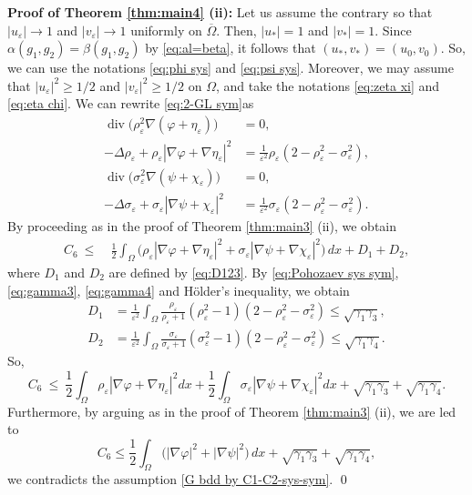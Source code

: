 \documentclass[a4paper,10pt,reqno]{amsart}
\theoremstyle{definition}
\newcommand{\al}{{\alpha}}
\newcommand{\ga}{{\gamma}}
\newcommand{\ve}{{\varepsilon}}
\newcommand{\vp}{{\varphi}}
\newcommand{\Om}{{\Omega}}
\numberwithin{equation}{section}
\begin{document}
 \smallskip
{\bf Proof of Theorem \ref{thm:main4} (ii): }
Let us assume the contrary so that $|u_\ve|\to 1$ and $|v_\ve|\to 1$ uniformly on $\overline\Om$.
Then, $|u_*|=1$ and $|v_*|=1$.
Since $\al(g_1,g_2)=\beta (g_1,g_2)$ by \eqref{eq:al=beta}, it follows that $(u_*,v_*)=(u_0,v_0)$.
So, we can use the notations \eqref{eq:phi sys} and \eqref{eq:psi sys}.
Moreover,   we may assume that $|u_\ve|^2 \ge 1/2$ and $|v_\ve|^2 \ge 1/2$ on $\Om$, and take the notations \eqref{eq:zeta xi} and \eqref{eq:eta chi}.
We can rewrite  \eqref{eq:2-GL sym}as
\begin{align}
\label{eq:rho-sys}
\operatorname{div} \big(\rho_\varepsilon^2 \nabla( \varphi+\eta_\varepsilon )\big) &= 0,  \\
\label{eq:zeta-sys}
-\Delta \rho_\varepsilon + \rho_\varepsilon | \nabla \varphi + \nabla \eta_\varepsilon |^2
&= \frac{1}{\varepsilon^2}\rho_\varepsilon \left( 2 -  \rho_\varepsilon^2  - \sigma_\varepsilon^2\right)  ,\\
\label{eq:sigma-sys}
\operatorname{div}\big(\sigma_\varepsilon^2 \nabla( \psi+\chi_\varepsilon )\big) &= 0, \\
\label{eq:xi-sys}
-\Delta \sigma_\varepsilon + \sigma_\varepsilon |  \nabla \psi+\chi_\varepsilon |^2
&= \frac{1}{\varepsilon^2}\sigma_\varepsilon \left( 2 -  \rho_\varepsilon^2  - \sigma_\varepsilon^2\right) .
\end{align}
By proceeding as in the proof of Theorem \ref{thm:main3} (ii), we obtain
\begin{align*}
C_6 ~ \le ~&   \frac12 \int_\Omega  \Big( \rho_\varepsilon  | \nabla \varphi+\nabla \eta_\varepsilon|^2
+ \sigma_\varepsilon  | \nabla \psi+\nabla \chi_\varepsilon |^2\Big) \, dx + D_1+D_2 ,
\end{align*}
 where $D_1$ and $D_2$ are defined by \eqref{eq:D123}.
By \eqref{eq:Pohozaev sys sym}, \eqref{eq:gamma3}, \eqref{eq:gamma4} and H\"{o}lder's inequality, we obtain
\begin{align*}
 D_1 & =  \frac{1}{\varepsilon^2} \int_\Om  \frac{\rho_\ve}{\rho_\ve+1} (\rho_\varepsilon^2 - 1)(2 - \rho_\varepsilon^2 -  \sigma_\varepsilon^2) \le \sqrt{\ga_1\ga_3},\\
 D_2 & =  \frac{1}{\varepsilon^2} \int_\Om  \frac{\sigma_\ve}{\sigma_\ve+1} (\sigma_\varepsilon^2 - 1)(2 - \rho_\varepsilon^2 -  \sigma_\varepsilon^2) \le \sqrt{\ga_1\ga_4}.
\end{align*}
So,
\[ C_6 ~ \le ~   \frac{1}{2}\int_\Omega  \rho_\varepsilon  | \nabla \varphi+\nabla \eta_\varepsilon|^2 dx + \frac{1}{2}\int_\Omega
 \sigma_\varepsilon  |\nabla \psi+\nabla \chi_\varepsilon |^2 dx + \sqrt{\ga_1\ga_3} + \sqrt{\ga_1\ga_4}.
 \]
 Furthermore, by arguing as in the proof of Theorem \ref{thm:main3} (ii), we are led to
\[ C_6 \le \frac{1}{2}\int_\Omega  \big(    |\nabla \vp|^2+   |\nabla \psi|^2 \big) \, dx  + \sqrt{\ga_1\ga_3} + \sqrt{\ga_1\ga_4},
\]
we  contradicts   the assumption \eqref{G bdd by C1-C2-sys-sym}.
\qed
\smallskip
\end{document}
